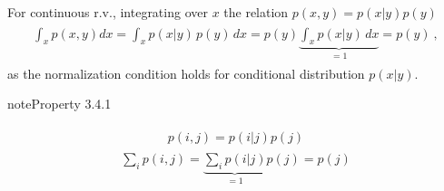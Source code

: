 \documentclass[letterpaper,10pt,english]{jupyterBook}
\begin{document}
\sphinxAtStartPar
For continuous r.v., integrating over \(x\) the relation \(p(x,y) = p(x|y) p(y)\)
\begin{equation*}
\begin{split}\begin{aligned}
  \int_{x} p(x,y) d x = \int_{x} p(x|y) \, p(y) \, dx = p(y) \underbrace{\int_{x} p(x|y) \, dx}_{= 1} = p(y) \ ,
\end{aligned}\end{split}
\end{equation*}
\sphinxAtStartPar
as the normalization condition holds for conditional distribution \(p(x|y)\).
\label{ch/prob/rv-multi-dimensional:property-0}
\begin{sphinxadmonition}{note}{Property 3.4.1}


\begin{equation*}
\begin{split}\begin{aligned}
  p(i,j) = p(i|j) p(j)
\end{aligned}\end{split}
\end{equation*}\begin{equation*}
\begin{split}\sum_i p(i,j) = \underbrace{\sum_i p(i|j)}_{=1} p(j) = p(j)\end{split}
\end{equation*}\end{sphinxadmonition}
\end{document}
